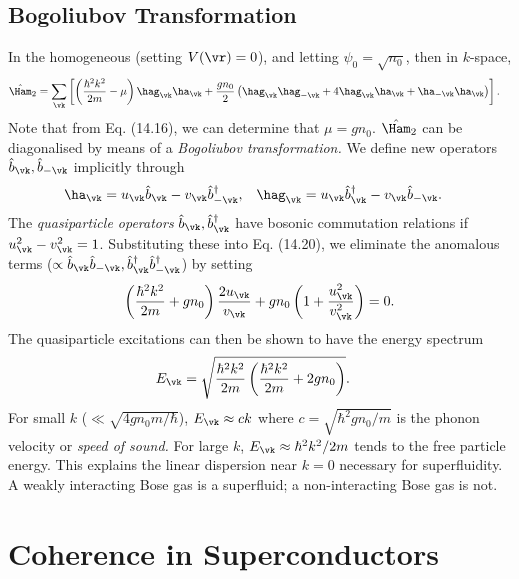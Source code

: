 \documentclass[qo.tex]{subfiles}
\begin{document}
\section{Bogoliubov Transformation}
In the homogeneous (setting $V(\vr)=0$), and letting $\psi_0=\sqrt{n_0}$, then in $k$-space,
\begin{align}
    \hat{\Ham}_2 &= \sum_{\vk}\left[\left(\frac{\hbar^2k^2}{2m}-\mu\right)\hag_{\vk}\ha_{\vk} + \frac{gn_0}{2}\left(\hag_{\vk}\hag_{-\vk} + 4\hag_{\vk}\ha_{\vk} + \ha_{-\vk}\ha_{\vk}\right)\right].
\end{align}
Note that from Eq. (14.16), we can determine that $\mu=gn_0$.
$\hat{\Ham}_2$ can be diagonalised by means of a \emph{Bogoliubov transformation.}
We define new operators $\hat{b}_{\vk},\hat{b}_{-\vk}$ implicitly through
\begin{align}
    \ha_{\vk} &= u_{\vk}\hat{b}_{\vk} - v_{\vk}\hat{b}^\dagger_{-\vk}, & \hag_{\vk} &= u_{\vk}\hat{b}^\dagger_{\vk} - v_{\vk}\hat{b}_{-\vk}.
\end{align}
The \emph{quasiparticle operators} $\hat{b}_{\vk},\hat{b}^\dagger_{\vk}$ have bosonic commutation relations if $u_{\vk}^2-v_{\vk}^2=1$.
Substituting these into Eq. (14.20), we eliminate the anomalous terms ($\propto \hat{b}_{\vk}\hat{b}_{-\vk},\hat{b}^\dagger_{\vk}\hat{b}^\dagger_{-\vk}$) by setting
\begin{align}
    \left(\frac{\hbar^2k^2}{2m}+gn_0\right) \frac{2u_{\vk}}{v_{\vk}} + gn_0\left(1+\frac{u_{\vk}^2}{v_{\vk}^2}\right) = 0.
\end{align}
The quasiparticle excitations can then be shown to have the energy spectrum
\begin{align}
    E_{\vk} &= \sqrt{\frac{\hbar^2k^2}{2m}\left(\frac{\hbar^2k^2}{2m}+2gn_0\right)}.
\end{align}
For small $k$ ($\ll\sqrt{4gn_0m/\hbar}$), $E_{\vk}\approx ck$ where $c=\sqrt{\hbar^2gn_0/m}$ is the phonon velocity or \emph{speed of sound.}
For large $k$, $E_{\vk}\approx \hbar^2k^2/2m$ tends to the free particle energy. 
This explains the linear dispersion near $k=0$ necessary for superfluidity. 
A weakly interacting Bose gas is a superfluid; a non-interacting Bose gas is not. 

\chapter{Coherence in Superconductors}
\end{document}
